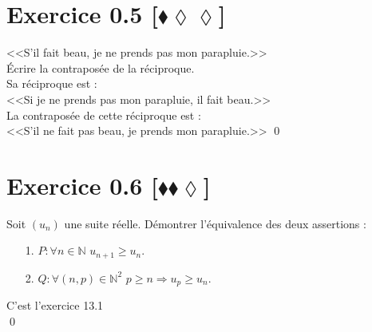 \documentclass[10pt]{article}
\begin{document}
\section*{Exercice 0.5 [$\blacklozenge\lozenge\lozenge$]}
\begin{tcolorbox}[enhanced, width=7in, center, size=fbox, fontupper=\large, drop shadow southwest]
    <<S'il fait beau, je ne prends pas mon parapluie.>>\\
    Écrire la contraposée de la réciproque.\\[0.5cm]
    Sa réciproque est :\\
    <<Si je ne prends pas mon parapluie, il fait beau.>>\\[0.5cm]
    La contraposée de cette réciproque est :\\
    <<S'il ne fait pas beau, je prends mon parapluie.>> \qed
\end{tcolorbox}

\section*{Exercice 0.6 [$\blacklozenge\blacklozenge\lozenge$]}
\begin{tcolorbox}[enhanced, width=7in, center, size=fbox, fontupper=\large, drop shadow southwest]
    Soit $(u_n)$ une suite réelle. Démontrer l'équivalence des deux assertions :
    \begin{itemize}
        \item[1.] $P:\forall{n\in\mathbb{N}}$ \hspace{0.25cm} $u_{n+1} \geq u_n$. 
        \item[2.] $Q:\forall{(n,p)\in\mathbb{N}^2}$ \hspace{0.25cm} $p \geq n \Longrightarrow u_p \geq u_n$. 
    \end{itemize}
    C'est l'exercice 13.1\\
    \qed
    \end{tcolorbox}
\end{document}
